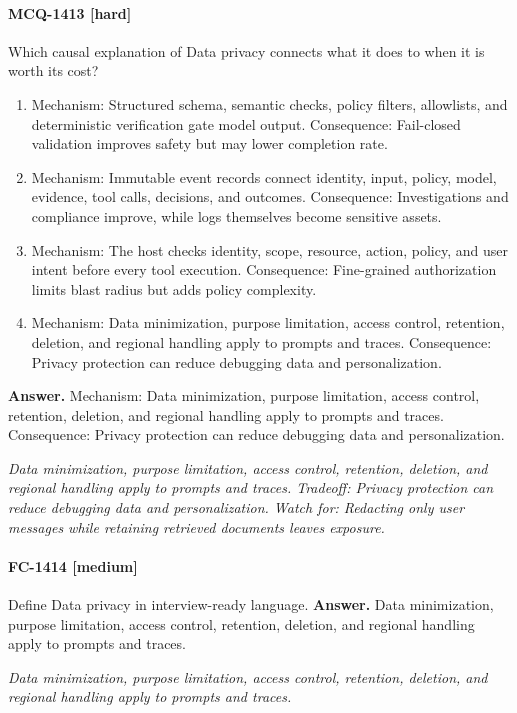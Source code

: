 \paragraph{MCQ-1413 [hard]} Which causal explanation of Data privacy connects what it does to when it is worth its cost?
\begin{enumerate}[label=\Alph*.]
\item Mechanism: Structured schema, semantic checks, policy filters, allowlists, and deterministic verification gate model output. Consequence: Fail-closed validation improves safety but may lower completion rate.
\item Mechanism: Immutable event records connect identity, input, policy, model, evidence, tool calls, decisions, and outcomes. Consequence: Investigations and compliance improve, while logs themselves become sensitive assets.
\item Mechanism: The host checks identity, scope, resource, action, policy, and user intent before every tool execution. Consequence: Fine-grained authorization limits blast radius but adds policy complexity.
\item Mechanism: Data minimization, purpose limitation, access control, retention, deletion, and regional handling apply to prompts and traces. Consequence: Privacy protection can reduce debugging data and personalization.
\end{enumerate}
\noindent\textbf{Answer.} Mechanism: Data minimization, purpose limitation, access control, retention, deletion, and regional handling apply to prompts and traces. Consequence: Privacy protection can reduce debugging data and personalization.
\par\textit{Data minimization, purpose limitation, access control, retention, deletion, and regional handling apply to prompts and traces. Tradeoff: Privacy protection can reduce debugging data and personalization. Watch for: Redacting only user messages while retaining retrieved documents leaves exposure.}
\paragraph{FC-1414 [medium]} Define Data privacy in interview-ready language.
\noindent\textbf{Answer.} Data minimization, purpose limitation, access control, retention, deletion, and regional handling apply to prompts and traces.
\par\textit{Data minimization, purpose limitation, access control, retention, deletion, and regional handling apply to prompts and traces.}
